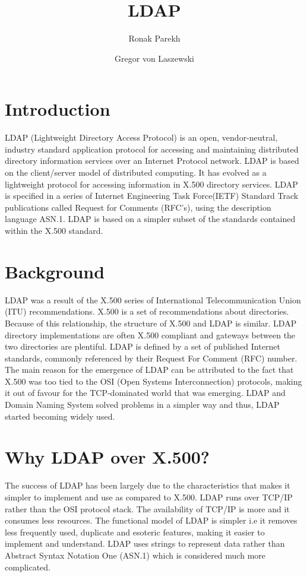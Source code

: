 \documentclass[9pt,twocolumn,twoside]{../../styles/osajnl}
\title{LDAP}
\author[1]{Ronak Parekh}
\author[2]{Gregor von Laszewski}
\affil[1]{School of Informatics and Computing, Bloomington, IN 47408, U.S.A.}
\affil[*]{Corresponding authors: parekhr@indiana.edu}
\begin{document}
\maketitle

\section{Introduction}

LDAP (Lightweight Directory Access Protocol) is an open,
vendor-neutral, industry standard application protocol for accessing
and maintaining distributed directory information services over an
Internet Protocol network.\cite{www-ldap-wikipedia} LDAP is based on the
client/server model of distributed computing. It has evolved as a
lightweight protocol for accessing information in X.500 directory
services.\cite{ldap-ibm-book} LDAP is specified in a series of
Internet Engineering Task Force(IETF) Standard Track publications
called Request for Comments (RFC's), using the description language
ASN.1. LDAP is based on a simpler subset of the standards contained
within the X.500 standard.

\section{Background}
LDAP was a result of the X.500 series of International
Telecommunication Union (ITU) recommendations.  X.500 is a set of
recommendations about directories. \cite{ldap-ibm-book} Because of this
relationship, the structure of X.500 and LDAP is similar. LDAP
directory implementations are often X.500 compliant and gateways
between the two directories are plentiful. LDAP is defined by a set of
published Internet standards, commonly referenced by their Request For
Comment (RFC) number. The main reason for the emergence of LDAP can be
attributed to the fact that X.500 was too tied to the OSI (Open
Systems Interconnection) protocols, making it out of favour for the
TCP-dominated world that was emerging. LDAP and Domain Naming System
solved problems in a simpler way and thus, LDAP started becoming
widely used. \cite{ldap-ibm-book}

\section{Why LDAP over X.500?}
The success of LDAP has been largely due to the characteristics that
makes it simpler to implement and use as compared to X.500. LDAP runs
over TCP/IP rather than the OSI protocol stack. The availability of
TCP/IP is more and it consumes less resources. The functional model of
LDAP is simpler i.e it removes less frequently used, duplicate and
esoteric features, making it easier to implement and understand. LDAP
uses strings to represent data rather than Abstract Syntax Notation
One (ASN.1) which is considered much more
complicated.\cite{ldap-ibm-book}
\end{document}
